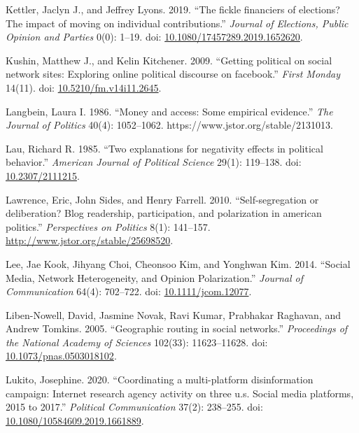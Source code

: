 \documentclass[12pt,]{article}
\newlength{\cslhangindent}
\newenvironment{CSLReferences}[2]%
    {\setlength{\parindent}{0pt}%
    \everypar{\setlength{\hangindent}{\cslhangindent}}\ignorespaces}%
    {\par}
\begin{document}
\begin{CSLReferences}{1}{0}
\leavevmode{}%
Kettler, Jaclyn J., and Jeffrey Lyons. 2019. {``The fickle financiers of
elections? The impact of moving on individual contributions.''}
\emph{Journal of Elections, Public Opinion and Parties} 0(0): 1--19.
doi:
\href{https://doi.org/10.1080/17457289.2019.1652620}{10.1080/17457289.2019.1652620}.

\leavevmode{}%
Kushin, Matthew J., and Kelin Kitchener. 2009. {``Getting political on
social network sites: Exploring online political discourse on
facebook.''} \emph{First Monday} 14(11). doi:
\href{https://doi.org/10.5210/fm.v14i11.2645}{10.5210/fm.v14i11.2645}.

\leavevmode{}%
Langbein, Laura I. 1986. {``Money and access: Some empirical
evidence.''} \emph{The Journal of Politics} 40(4): 1052--1062.
https://www.jstor.org/stable/2131013.

\leavevmode{}%
Lau, Richard R. 1985. {``Two explanations for negativity effects in
political behavior.''} \emph{American Journal of Political Science}
29(1): 119--138. doi:
\href{https://doi.org/10.2307/2111215}{10.2307/2111215}.

\leavevmode{}%
Lawrence, Eric, John Sides, and Henry Farrell. 2010. {``Self-segregation
or deliberation? Blog readership, participation, and polarization in
american politics.''} \emph{Perspectives on Politics} 8(1): 141--157.
\url{http://www.jstor.org/stable/25698520}.

\leavevmode{}%
Lee, Jae Kook, Jihyang Choi, Cheonsoo Kim, and Yonghwan Kim. 2014.
{``{Social Media, Network Heterogeneity, and Opinion Polarization}.''}
\emph{Journal of Communication} 64(4): 702--722. doi:
\href{https://doi.org/10.1111/jcom.12077}{10.1111/jcom.12077}.

\leavevmode{}%
Liben-Nowell, David, Jasmine Novak, Ravi Kumar, Prabhakar Raghavan, and
Andrew Tomkins. 2005. {``Geographic routing in social networks.''}
\emph{Proceedings of the National Academy of Sciences} 102(33):
11623--11628. doi:
\href{https://doi.org/10.1073/pnas.0503018102}{10.1073/pnas.0503018102}.

\leavevmode{}%
Lukito, Josephine. 2020. {``Coordinating a multi-platform disinformation
campaign: Internet research agency activity on three u.s. Social media
platforms, 2015 to 2017.''} \emph{Political Communication} 37(2):
238--255. doi:
\href{https://doi.org/10.1080/10584609.2019.1661889}{10.1080/10584609.2019.1661889}.


\end{CSLReferences}
\end{document}
